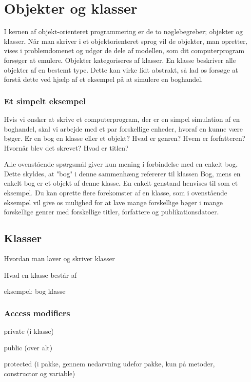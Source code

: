 \chapter{Objekter og klasser}

I kernen af objekt-orienteret programmering er de to nøglebegreber; objekter og klasser. Når man skriver i et objektorienteret sprog vil de objekter, man opretter, vises i problemdomenet og udgør de dele af modellen, som dit computerprogram forsøger at emulere. Objekter kategoriseres af klasser. En klasse beskriver alle objekter af en bestemt type. Dette kan virke lidt abstrakt, så lad os forsøge at forstå dette ved hjælp af et eksempel på at simulere en boghandel.

\subsection{Et simpelt eksempel}

Hvis vi ønsker at skrive et computerprogram, der er en simpel simulation af en boghandel, skal vi arbejde med et par forskellige enheder, hvoraf en kunne være bøger. Er en bog en klasse eller et objekt? Hvad er genren? Hvem er forfatteren? Hvornår blev det skrevet? Hvad er titlen?

Alle ovenstående spørgsmål giver kun mening i forbindelse med en enkelt bog. Dette skyldes, at "bog" i denne sammenhæng refererer til klassen Bog, mens en enkelt bog er et objekt af denne klasse. En enkelt genstand henvises til som et eksempel. Du kan oprette flere forekomster af en klasse, som i ovenstående eksempel vil give os mulighed for at lave mange forskellige bøger i mange forskellige genrer med forskellige titler, forfattere og publikationsdatoer.

\section{Klasser}

Hvordan man laver og skriver klasser

Hvad en klasse består af

eksempel: bog klasse

\subsection{Access modifiers}

private (i klasse)

public (over alt)

protected (i pakke, gennem nedarvning udefor pakke, kun på metoder, constructor og variable)

